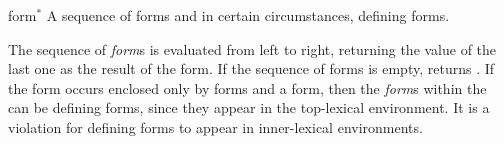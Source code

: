 \begin{optDefinition}
%
\Syntax
{}%
%
\begin{arguments}
    \item[form\/$^*$] A sequence of forms and in certain circumstances, defining
    forms.
\end{arguments}
%
\result%
The sequence of {\em form}s is evaluated from left to right, returning the value
of the last one as the result of the  form.  If the sequence
of forms is empty,  returns \nil{}.
%
\remarks%
If the  form occurs enclosed only by  forms
and a  form, then the {\em form}s within the
 can be defining forms, since they appear in the top-lexical
environment.  It is a violation for defining forms to appear in inner-lexical
environments.

%


\end{optDefinition}
